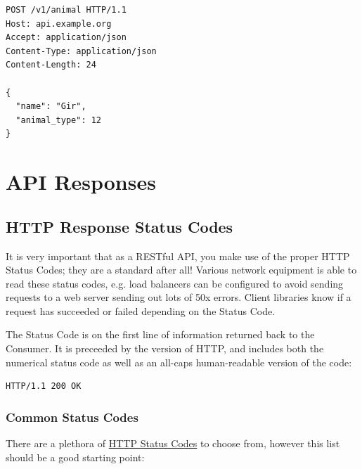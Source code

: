 \documentclass{book}
\begin{document}
\begin{verbatim}
POST /v1/animal HTTP/1.1
Host: api.example.org
Accept: application/json
Content-Type: application/json
Content-Length: 24

{
  "name": "Gir",
  "animal_type": 12
}
\end{verbatim}


\chapter{API Responses}

\section{HTTP Response Status Codes}

It is very important that as a RESTful API, you make use of the proper HTTP Status Codes; they are a standard after all! Various network equipment is able to read these status codes, e.g. load balancers can be configured to avoid sending requests to a web server sending out lots of 50x errors. Client libraries know if a request has succeeded or failed depending on the Status Code.

The Status Code is on the first line of information returned back to the Consumer. It is preceeded by the version of HTTP, and includes both the numerical status code as well as an all-caps human-readable version of the code:

\begin{verbatim}
HTTP/1.1 200 OK
\end{verbatim}

\subsection{Common Status Codes}

There are a plethora of \href{http://www.w3.org/Protocols/rfc2616/rfc2616-sec10.html}{HTTP Status Codes} to choose from, however this list should be a good starting point:
\end{document}
